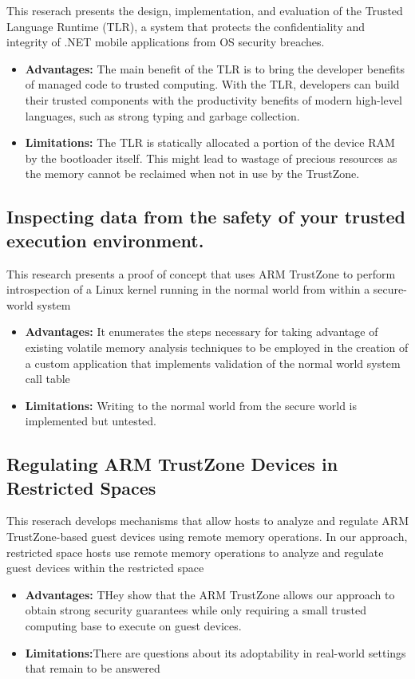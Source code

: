 \documentclass[conference]{IEEEtran}
\begin{document}
\cite{mobile6} This reserach presents the design, implementation, and evaluation of the Trusted Language Runtime (TLR), a system that protects the confidentiality and integrity of .NET mobile applications from OS security breaches.
\begin{itemize}
    \item \textbf{Advantages:} The main benefit of the TLR is to bring the developer benefits of managed code to trusted computing. With the TLR, developers can build their trusted components with the productivity benefits of modern high-level languages, such as strong typing and garbage collection.
    \item \textbf{Limitations:} The TLR is  statically allocated a portion of the device RAM by the bootloader itself. This might lead to wastage of precious resources as the memory cannot be reclaimed when not in use by the TrustZone.
\end{itemize}


\subsection{Inspecting data from the safety of your trusted execution environment.}

\cite{mobile7} This research presents a proof of concept that uses ARM TrustZone to perform introspection of a Linux kernel running in the normal world from within a secure-world system
\begin{itemize}
    \item \textbf{Advantages:} It enumerates the steps necessary for taking advantage of existing volatile memory analysis techniques to be employed in the creation of a custom application that implements validation of the normal world system call table
    \item \textbf{Limitations:} Writing to the normal world from the secure world is implemented but untested.
\end{itemize}


\subsection{Regulating ARM TrustZone Devices in Restricted Spaces}

\cite{mobile8} This reserach develops mechanisms that allow hosts to analyze and regulate ARM TrustZone-based guest devices using remote memory operations.  In our approach, restricted space hosts use remote memory operations to analyze and regulate guest devices within the restricted space
\begin{itemize}
    \item \textbf{Advantages:} THey show that the ARM TrustZone allows our approach to obtain strong security guarantees while only requiring a small trusted computing base to execute on guest devices.
    \item \textbf{Limitations:}There are questions about its adoptability in real-world settings that remain to be answered
\end{itemize}
\end{document}
